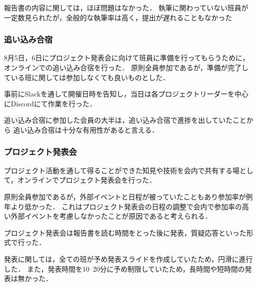 報告書の内容に関しては，ほぼ問題はなかった．
執筆に関わっていない班員が一定数見られたが，全般的な執筆率は高く，提出が遅れることもなかった

\subsubsection*{追い込み合宿}
8月5日，6日にプロジェクト発表会に向けて班員に準備を行ってもらうために，オンラインでの追い込み合宿を行った．
原則全員参加であるが，準備が完了している班に関しては参加しなくても良いものとした．

事前にSlackを通して開催日時を告知し，当日は各プロジェクトリーダーを中心にDiscordにて作業を行った．

追い込み合宿に参加した会員の大半は，追い込み合宿で進捗を出していたことから
追い込み合宿は十分な有用性があると言える．

\subsubsection*{プロジェクト発表会}
プロジェクト活動を通して得ることができた知見や技術を会内で共有する場として，オンラインでプロジェクト発表会を行った．

原則全員参加であるが，外部イベントと日程が被っていたこともあり参加率が例年より低かった．
これはプロジェクト発表会の日程の調整で会内で参加率の高い外部イベントを考慮しなかったことが原因であると考えられる．

プロジェクト発表会は報告書を読む時間をとった後に発表，質疑応答といった形式で行った．

発表に関しては，全ての班が予め発表スライドを作成していたため，円滑に進行した．
また，発表時間を10~20分に予め制限していたため，長時間や短時間の発表は無かった．

